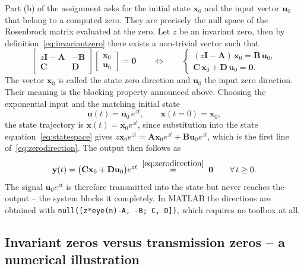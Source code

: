 Part (b) of the assignment asks for the initial state $\mathbf{x}_0$ and the input vector
$\mathbf{u}_0$ that belong to a computed zero. They are precisely the null space of the
Rosenbrock matrix evaluated at the zero. Let $z$ be an invariant zero, then by
definition~\eqref{eq:invariantzero} there exists a non-trivial vector such that
\begin{equation}
    \begin{bmatrix}
        z\mathbf{I}-\mathbf{A} & -\mathbf{B} \\ \mathbf{C} & \mathbf{D}
    \end{bmatrix}
    \begin{bmatrix}\mathbf{x}_0\\ \mathbf{u}_0\end{bmatrix} = \mathbf{0}
    \qquad\Longleftrightarrow\qquad
    \begin{cases}
        (z\mathbf{I}-\mathbf{A})\,\mathbf{x}_0 = \mathbf{B}\,\mathbf{u}_0, \\[2pt]
        \mathbf{C}\,\mathbf{x}_0 + \mathbf{D}\,\mathbf{u}_0 = \mathbf{0} .
    \end{cases}
    \label{eq:zerodirection}
\end{equation}
The vector $\mathbf{x}_0$ is called the state zero direction and $\mathbf{u}_0$ the input zero
direction. Their meaning is the blocking property announced above. Choosing the exponential
input and the matching initial state
\begin{equation}
    \mathbf{u}(t) = \mathbf{u}_0\,e^{zt}, \qquad \mathbf{x}(t=0)=\mathbf{x}_0 ,
    \label{eq:blockinginput}
\end{equation}
the state trajectory is $\mathbf{x}(t)=\mathbf{x}_0e^{zt}$, since substitution into the state
equation~\eqref{eq:statespace} gives
$z\mathbf{x}_0e^{zt} = \mathbf{A}\mathbf{x}_0e^{zt}+\mathbf{B}\mathbf{u}_0e^{zt}$, which is the
first line of~\eqref{eq:zerodirection}. The output then follows as
\begin{equation}
    \mathbf{y}(t) = \big(\mathbf{C}\mathbf{x}_0+\mathbf{D}\mathbf{u}_0\big)e^{zt}
    \;\overset{\eqref{eq:zerodirection}}{=}\;\mathbf{0}\qquad \forall\, t\geq 0 .
    \label{eq:blocked}
\end{equation}
The signal $\mathbf{u}_0e^{zt}$ is therefore transmitted into the state but never reaches the
output -- the system blocks it completely. In MATLAB the directions are obtained with
\texttt{null([z*eye(n)-A, -B; C, D])}, which requires no toolbox at all.

\subsection{Invariant zeros versus transmission zeros -- a numerical illustration}
\label{sec:invvstrans}

